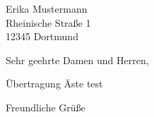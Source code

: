 \documentclass[version=last, Briefvorlage]{scrlttr2}
\begin{document}
%
\begin{letter}{%
		Erika Mustermann\\
		Rheinische Straße 1\\
		12345 Dortmund%
	}
	\opening{Sehr geehrte Damen und Herren,}
	Übertragung Äste test
	\closing{Freundliche Grüße}
\end{letter}
%
\end{document}
